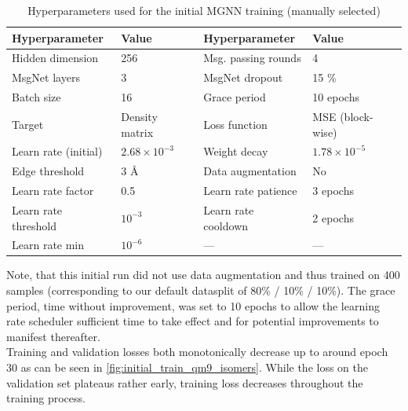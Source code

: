 \begin{table}[H]
    \centering
    \caption{Hyperparameters used for the initial MGNN training (manually selected)}
    \label{tab:init_hparams}
    \begin{tabular}{ll ll}
        \toprule
        \textbf{Hyperparameter} & \textbf{Value} & \textbf{Hyperparameter} & \textbf{Value} \\
        \midrule
        Hidden dimension & 256 & Msg. passing rounds & 4 \\
        MsgNet layers & 3 & MsgNet dropout & 15 \% \\
        Batch size & 16 & Grace period & 10 epochs \\
        Target & Density matrix & Loss function & MSE (block-wise) \\
        Learn rate (initial) & $2.68 \times 10^{-3}$ & Weight decay & $1.78 \times 10^{-5}$ \\
        Edge threshold & 3 \AA & Data augmentation & No \\
        \midrule
        Learn rate factor & 0.5 & Learn rate patience & 3 epochs \\
        Learn rate threshold & $10^{-3}$ & Learn rate cooldown & 2 epochs \\
        Learn rate min & $10^{-6}$ & — & — \\
        \bottomrule
    \end{tabular}
\end{table}
Note, that this initial run did not use data augmentation and thus trained on 400 samples (corresponding to our default datasplit of 80\% / 10\% / 10\%). The grace period, time without improvement, was set to 10 epochs to allow the learning rate scheduler sufficient time to take effect and for potential improvements to manifest thereafter.\\
Training and validation losses both monotonically decrease up to around epoch 30 as can be seen in \autoref{fig:initial_train_qm9_isomers}. While the loss on the validation set plateaus rather early, training loss decreases throughout the training process. 

